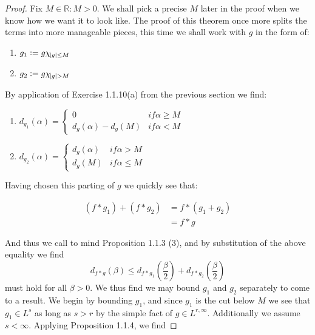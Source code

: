\begin{proof}

Fix $M \in \mathbb{R} : M>0$. We shall pick a precise $M$ later in the proof when we know how we want it to look like. 
The proof of this theorem once more splits the terms into more manageable pieces, this time we shall work with $g$ in the form of:
\begin{enumerate}
\item $g_1 := g\chi_{\abs{g}\leq M}$
\item $g_2 := g\chi_{\abs{g} > M}$ 
\end{enumerate}

By application of Exercise 1.1.10(a) from the previous section we find:

\begin{enumerate}
\item $d_{g_1}(\alpha) = 
\begin{cases}
\displaystyle
0 & if \alpha \geq M \\
\displaystyle
d_g(\alpha) - d_g(M) & if \alpha < M
\end{cases}$
\item $d_{g_2}(\alpha) = 
\begin{cases}
\displaystyle
d_g(\alpha) & if \alpha > M \\
\displaystyle
d_g(M) & if \alpha \leq M
\end{cases}$
\end{enumerate}

Having chosen this parting of $g$ we quickly see that:

\begin{align*}
(f \ast g_1) + (f\ast g_2) &= f \ast (g_1 + g_2) \\
&= f \ast g
\end{align*}

And thus we call to mind Proposition 1.1.3 (3), and by substitution of the above equality we find
\begin{equation*}
d_{f \ast g}(\beta) \leq d_{f \ast g_1} (\frac{\beta}{2}) + d_{f \ast g_2} (\frac{\beta}{2})
\end{equation*}
must hold for all $\beta > 0$. We thus find we may bound $g_1$ and $g_2$ separately to come to a result. We begin by bounding $g_1$, and since $g_1$ is the cut below $M$ we see that $g_1 \in L^s$ as long as $s > r$ by the simple fact of $g \in L^{r,\infty}$. Additionally we assume $s < \infty$. Applying Proposition 1.1.4, we find


\end{proof}
